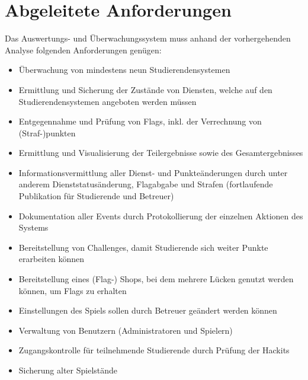 \section{Abgeleitete Anforderungen}
\label{sec:Abgeleitete_Anforderungen}

Das Auswertungs- und Überwachungssystem muss anhand der vorhergehenden Analyse folgenden Anforderungen genügen:
\begin{itemize}
	\item Überwachung von mindestens neun Studierendensystemen
	\item Ermittlung und Sicherung der Zustände von Diensten, welche auf den Studierendensystemen angeboten werden müssen
	\item Entgegennahme und Prüfung von Flags, inkl. der Verrechnung von (Straf-)punkten
	\item Ermittlung und Visualisierung der Teilergebnisse sowie des Gesamtergebnisses
	\item Informationsvermittlung aller Dienst- und Punkteänderungen durch unter anderem Dienststatusänderung, Flagabgabe und Strafen (fortlaufende Publikation für Studierende und Betreuer)
	\item Dokumentation aller Events durch Protokollierung der einzelnen Aktionen des Systems
	\item Bereitstellung von Challenges, damit Studierende sich weiter Punkte erarbeiten können
	\item Bereitstellung eines (Flag-) Shops, bei dem mehrere Lücken genutzt werden können, um Flags zu erhalten
	\item Einstellungen des Spiels sollen durch Betreuer geändert werden können
	\item Verwaltung von Benutzern (Administratoren und Spielern)
	\item Zugangskontrolle für teilnehmende Studierende durch Prüfung der Hackits
	\item Sicherung alter Spielstände
\end{itemize}